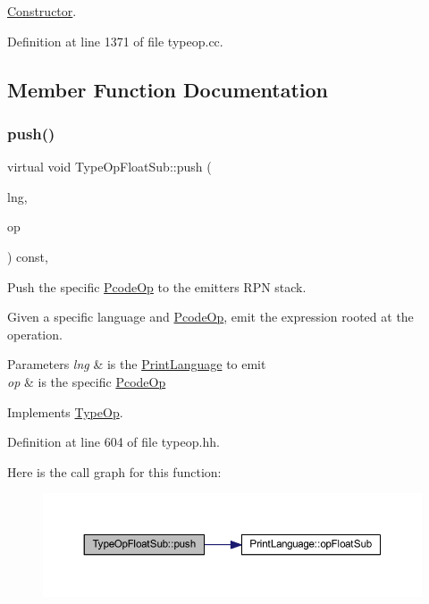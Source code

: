 \mbox{\hyperlink{class_constructor}{Constructor}}. 



Definition at line 1371 of file typeop.\+cc.



\subsection{Member Function Documentation}
\mbox{\label{class_type_op_float_sub_a1a2134cf9ae8bad422b03219c2efe1d9}} 
\subsubsection{\texorpdfstring{push()}{push()}}
{\footnotesize\ttfamily virtual void Type\+Op\+Float\+Sub\+::push (\begin{DoxyParamCaption}\item[{\mbox{\hyperlink{class_print_language}{Print\+Language}} $\ast$}]{lng,  }\item[{const \mbox{\hyperlink{class_pcode_op}{Pcode\+Op}} $\ast$}]{op }\end{DoxyParamCaption}) const\hspace{0.3cm}{\ttfamily [inline]}, {\ttfamily [virtual]}}



Push the specific \mbox{\hyperlink{class_pcode_op}{Pcode\+Op}} to the emitter\textquotesingle{}s R\+PN stack. 

Given a specific language and \mbox{\hyperlink{class_pcode_op}{Pcode\+Op}}, emit the expression rooted at the operation. 
\begin{DoxyParams}{Parameters}
{\em lng} & is the \mbox{\hyperlink{class_print_language}{Print\+Language}} to emit \\
\hline
{\em op} & is the specific \mbox{\hyperlink{class_pcode_op}{Pcode\+Op}} \\
\hline
\end{DoxyParams}


Implements \mbox{\hyperlink{class_type_op_ac9c9544203ed74dabe6ac662b653b2af}{Type\+Op}}.



Definition at line 604 of file typeop.\+hh.

Here is the call graph for this function\+:
\nopagebreak
\begin{figure}[H]
\begin{center}
\leavevmode
\includegraphics[width=350pt]{class_type_op_float_sub_a1a2134cf9ae8bad422b03219c2efe1d9_cgraph}
\end{center}
\end{figure}


